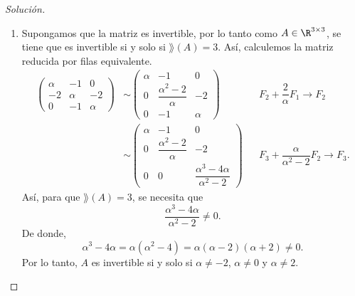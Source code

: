 \documentclass[a4,11pt]{aleph-notas}
\begin{document}
\begin{proof}[Solución]\hspace{0pt}
    \begin{enumerate}
        \item Supongamos que la matriz es invertible, por lo tanto como $A\in\R^{3\times 3}$, se tiene que es invertible si y solo si $\rang(A)=3$. Así, calculemos la matriz reducida por filas equivalente.
        \begin{align*}
            \begin{pmatrix}
                \alpha & -1 & 0 \\
                -2 & \alpha & -2 \\
                0 & -1 & \alpha
            \end{pmatrix}
         & \sim \begin{pmatrix}
                \alpha & -1 & 0 \\
                0 & \dfrac{\alpha^2-2}{\alpha} & -2 \\
                0 & -1 & \alpha 
            \end{pmatrix} && F_2 + \dfrac{2}{\alpha} F_1 \rightarrow F_2 \\
        &\sim \begin{pmatrix}
                \alpha & -1 & 0 \\
                0 & \dfrac{\alpha^2-2}{\alpha} & -2 \\
                0 & 0 & \dfrac{\alpha^3-4\alpha}{\alpha^2-2}
            \end{pmatrix} && F_3 + \dfrac{\alpha}{\alpha^2-2} F_2 \rightarrow F_3.
        \end{align*}
        Así, para que $\rang(A)=3$, se necesita que 
        \[
            \dfrac{\alpha^3-4\alpha}{\alpha^2-2} \neq 0.
        \]
        De donde, 
        \[
            \alpha^3-4\alpha = \alpha ( \alpha^2-4) = \alpha (\alpha-2)(\alpha+2)\neq 0.
        \]
        Por lo tanto, $A$ es invertible si y solo si $\alpha \neq-2$, $\alpha\neq0$ y $\alpha\neq2$.

\end{enumerate}
\end{proof}
\end{document}
